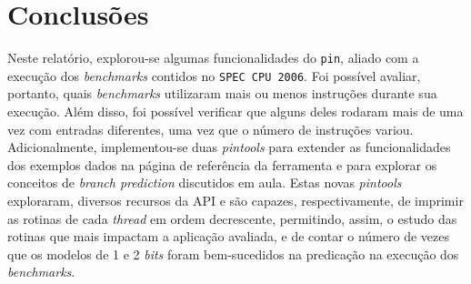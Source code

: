 \documentclass[12pt]{article}
\begin{document}
\section{Conclusões}

Neste relatório, explorou-se algumas funcionalidades do \texttt{pin}, aliado
com a execução dos \textit{benchmarks} contidos no \texttt{SPEC CPU 2006}. Foi
possível avaliar, portanto, quais \textit{benchmarks} utilizaram mais
ou menos instruções durante sua execução. Além disso, foi possível verificar
que alguns deles rodaram mais de uma vez com entradas diferentes, uma vez que o número de
instruções variou. Adicionalmente, implementou-se duas \textit{pintools} para
extender as funcionalidades dos exemplos dados na página de referência da ferramenta e para
explorar os conceitos de \textit{branch prediction} discutidos em aula.
Estas novas \textit{pintools} exploraram, diversos recursos da API e são
capazes, respectivamente, de imprimir as rotinas de cada \textit{thread} em ordem
decrescente, permitindo, assim, o estudo das rotinas que mais impactam a aplicação
avaliada, e de contar o número de vezes que os modelos de 1 e 2 \textit{bits}
foram bem-sucedidos na predicação na execução dos \textit{benchmarks}.




\end{document}

